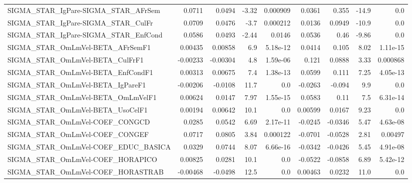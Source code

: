 \begin{tabular}{lrrrrrrrr}
SIGMA\_STAR\_IgPare-SIGMA\_STAR\_AFrSem   &      0.0711 &       0.0494 &   -3.32 & 0.000909 &     0.0361 &       0.355 &        -14.9 &           0.0 \\
SIGMA\_STAR\_IgPare-SIGMA\_STAR\_CulFr    &      0.0709 &       0.0476 &    -3.7 & 0.000212 &     0.0136 &      0.0949 &        -10.9 &           0.0 \\
SIGMA\_STAR\_IgPare-SIGMA\_STAR\_EnfCond  &      0.0586 &       0.0493 &   -2.44 &   0.0146 &     0.0536 &        0.46 &        -9.86 &           0.0 \\
SIGMA\_STAR\_OmLmVel-BETA\_AFrSemF1      &     0.00435 &      0.00858 &     6.9 & 5.18e-12 &     0.0414 &       0.105 &         8.02 &      1.11e-15 \\
SIGMA\_STAR\_OmLmVel-BETA\_CulFrF1       &    -0.00233 &     -0.00304 &     4.8 & 1.59e-06 &      0.121 &      0.0888 &         3.33 &      0.000868 \\
SIGMA\_STAR\_OmLmVel-BETA\_EnfCondF1     &     0.00313 &      0.00675 &     7.4 & 1.38e-13 &     0.0599 &       0.111 &         7.25 &      4.05e-13 \\
SIGMA\_STAR\_OmLmVel-BETA\_IgPareF1      &    -0.00206 &      -0.0108 &    11.7 &      0.0 &    -0.0263 &      -0.094 &          9.9 &           0.0 \\
SIGMA\_STAR\_OmLmVel-BETA\_OmLmVelF1     &     0.00624 &       0.0147 &    7.97 & 1.55e-15 &     0.0583 &        0.11 &          7.5 &      6.31e-14 \\
SIGMA\_STAR\_OmLmVel-BETA\_UsoCelF1      &     0.00194 &      0.00642 &    10.1 &      0.0 &    0.00599 &      0.0167 &         9.23 &           0.0 \\
SIGMA\_STAR\_OmLmVel-COEF\_CONGCD        &      0.0285 &       0.0542 &    6.69 & 2.17e-11 &    -0.0245 &     -0.0346 &         5.47 &      4.63e-08 \\
SIGMA\_STAR\_OmLmVel-COEF\_CONGEF        &      0.0717 &       0.0805 &    3.84 & 0.000122 &    -0.0701 &     -0.0528 &         2.81 &       0.00497 \\
SIGMA\_STAR\_OmLmVel-COEF\_EDUC\_BASICA   &      0.0329 &       0.0744 &    8.07 & 6.66e-16 &    -0.0342 &     -0.0426 &         5.45 &      4.91e-08 \\
SIGMA\_STAR\_OmLmVel-COEF\_HORAPICO      &     0.00825 &       0.0281 &    10.1 &      0.0 &    -0.0522 &     -0.0858 &         6.89 &      5.42e-12 \\
SIGMA\_STAR\_OmLmVel-COEF\_HORASTRAB     &    -0.00468 &      -0.0498 &    12.5 &      0.0 &    0.00463 &      0.0232 &         11.0 &           0.0 \\

\end{tabular}
